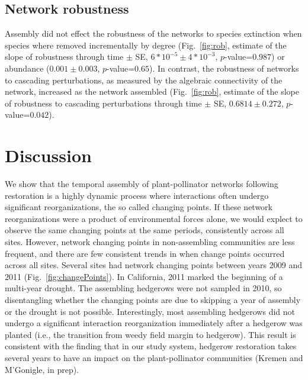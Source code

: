 \documentclass[12pt]{article}
\begin{document}
\subsection*{Network robustness}
Assembly did not effect the robustness of the networks to species
extinction when species where removed incrementally by degree
(Fig.~\ref{fig:rob}, estimate of the slope of robustness through time
$\pm$ SE, $6*10^{-5} \pm 4*10^{-3}$, $p$-value=$0.987$) or abundance
($0.001 \pm 0.003$, $p$-value=$0.65$). In contrast, the robustness of
networks to cascading perturbations, as measured by the algebraic
connectivity of the network, increased as the network assembled
(Fig.~\ref{fig:rob}, estimate of the slope of robustness to cascading
perturbations through time $\pm$ SE, $0.6814 \pm 0.272$,
$p$-value=$0.042$).

\section*{Discussion}
\label{sec:discussion}

We show that the temporal assembly of plant-pollinator networks
following restoration is a highly dynamic process where interactions
often undergo significant reorganizations, the so called changing
points. If these network reorganizations were a product of
environmental forces alone, we would explect to observe the same
changing points at the same periods, consistently across all
sites. However, network changing points in non-assembling communities
are less frequent, and there are few consistent trends in when change
points occurred across all sites. Several sites had network changing
points between years 2009 and 2011 (Fig.~\ref{fig:changePoints}). In
California, 2011 marked the beginning of a multi-year drought. The
assembling hedgerows were not sampled in 2010, so disentangling
whether the changing points are due to skipping a year of assembly or
the drought is not possible. Interestingly, most assembling hedgerows
did not undergo a significant interaction reorganization immediately
after a hedgerow was planted (i.e., the transition from weedy field
margin to hedgerow). This result is consistent with the finding that
in our study system, hedgerow restoration takes several years to have
an impact on the plant-pollinator communities (Kremen and M'Gonigle,
in prep).
\end{document}
